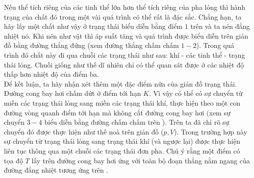 Nếu thể tích riêng của các tinh thể lớn hơn thể tích riêng của pha lỏng thì hành trạng của chất đó trong một vài quá trình có thể rất là đặc sắc. Chẳng hạn, ta hãy lấy một chất như vậy ở trạng thái biểu diễn bằng điểm $1$ trên  và ta nén đẳng nhiệt nó. Khi nén như vật thì áp suất tăng và quá trình được biểu diễn trên giản đồ bằng đường thẳng đứng (xem đường thẳng chấm chấm $1-2$). Trong quá trình đó chất này đi qua chuỗi các trạng thái như sau: khí - các tinh thể - trạng thái lỏng. Chuỗi giống như thế dĩ nhiên chỉ có thể quan sát được ở các nhiệt độ thấp hơn nhiệt độ của điểm ba.\\

Để kết luận, ta hãy nhận xét thêm một đặc điểm nữa của giản đồ trạng thái. Đường cong bay hơi chấm dứt ở điểm tới hạn $K$. Vì vậy có thể có sự chuyển từ miền các trạng thái lỏng sang miền các trạng thái khí, thực hiện theo một con đường vòng quanh điểm tới hạn mà không cắt đường cong bay hơi (xem sự chuyển $3-4$ biểu diễn bằng đường chấm chấm trên ). Trên  ta đã chỉ rõ sự chuyển đó được thực hiện như thế noà trên giản đồ ($p,V$). Trong trường hợp này sự chuyển từ trạng thái lỏng sang trạng thái khí (và ngược lại) được thực hiện liên tục thông qua một chuỗi các trạng thái đơn pha. Chú ý rằng một điểm có tọa độ $T$ lấy trên đường cong bay hơi ứng với toàn bộ đoạn thẳng nằm ngang của đường đẳng nhiệt tương ứng trên .\\

